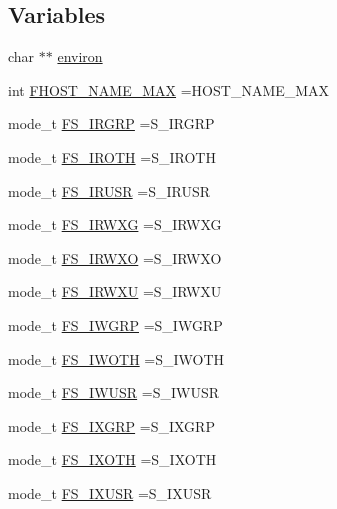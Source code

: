 \subsection*{Variables}
\begin{DoxyCompactItemize}
\item 
char $\ast$$\ast$ \mbox{\hyperlink{C-M__system_8c_aa006daaf11f1e2e45a6ababaf463212b}{environ}}
\item 
int \mbox{\hyperlink{C-M__system_8c_a55fec1e650e6037d352db493bea1716f}{F\+H\+O\+S\+T\+\_\+\+N\+A\+M\+E\+\_\+\+M\+AX}} =H\+O\+S\+T\+\_\+\+N\+A\+M\+E\+\_\+\+M\+AX
\item 
mode\+\_\+t \mbox{\hyperlink{C-M__system_8c_a9e37e108fa1a58b85031aed8634f65d0}{F\+S\+\_\+\+I\+R\+G\+RP}} =S\+\_\+\+I\+R\+G\+RP
\item 
mode\+\_\+t \mbox{\hyperlink{C-M__system_8c_a310094a449c3371ef9cf8b0776213835}{F\+S\+\_\+\+I\+R\+O\+TH}} =S\+\_\+\+I\+R\+O\+TH
\item 
mode\+\_\+t \mbox{\hyperlink{C-M__system_8c_a03e3496451f60edd6c69c3802e11db67}{F\+S\+\_\+\+I\+R\+U\+SR}} =S\+\_\+\+I\+R\+U\+SR
\item 
mode\+\_\+t \mbox{\hyperlink{C-M__system_8c_ab4e744ca243de9628a7e9651695d7a97}{F\+S\+\_\+\+I\+R\+W\+XG}} =S\+\_\+\+I\+R\+W\+XG
\item 
mode\+\_\+t \mbox{\hyperlink{C-M__system_8c_a612adf3e64ccb1734ab64ef6d73fa87b}{F\+S\+\_\+\+I\+R\+W\+XO}} =S\+\_\+\+I\+R\+W\+XO
\item 
mode\+\_\+t \mbox{\hyperlink{C-M__system_8c_acb420eb45e494ab53bbfd018c2262ff2}{F\+S\+\_\+\+I\+R\+W\+XU}} =S\+\_\+\+I\+R\+W\+XU
\item 
mode\+\_\+t \mbox{\hyperlink{C-M__system_8c_a739522a271fd37727d6f266197ded32b}{F\+S\+\_\+\+I\+W\+G\+RP}} =S\+\_\+\+I\+W\+G\+RP
\item 
mode\+\_\+t \mbox{\hyperlink{C-M__system_8c_a1ed0df6f1e0108d07c0fe7880402f8c0}{F\+S\+\_\+\+I\+W\+O\+TH}} =S\+\_\+\+I\+W\+O\+TH
\item 
mode\+\_\+t \mbox{\hyperlink{C-M__system_8c_ade549697e7611d5c3755b1befcd796b8}{F\+S\+\_\+\+I\+W\+U\+SR}} =S\+\_\+\+I\+W\+U\+SR
\item 
mode\+\_\+t \mbox{\hyperlink{C-M__system_8c_ac01832589f29b7d987cb90be63cc3dc8}{F\+S\+\_\+\+I\+X\+G\+RP}} =S\+\_\+\+I\+X\+G\+RP
\item 
mode\+\_\+t \mbox{\hyperlink{C-M__system_8c_aafbcf1020ef1a8f3999526f88f349fe3}{F\+S\+\_\+\+I\+X\+O\+TH}} =S\+\_\+\+I\+X\+O\+TH
\item 
mode\+\_\+t \mbox{\hyperlink{C-M__system_8c_acc949c15ea63678fc34579213919906f}{F\+S\+\_\+\+I\+X\+U\+SR}} =S\+\_\+\+I\+X\+U\+SR
$$
\end{DoxyCompactItemize}
